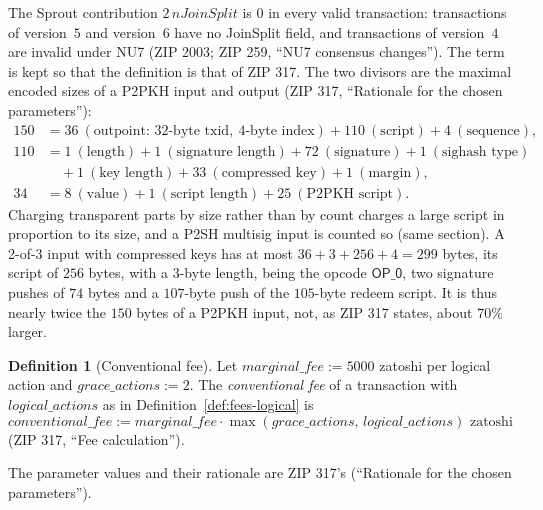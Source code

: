 \documentclass[11pt,a4paper]{article}
\theoremstyle{definition}
\newtheorem{definition}[theorem]{Definition}
\begin{document}
The Sprout contribution $2\,\mathit{nJoinSplit}$ is $0$ in every valid
transaction: transactions of version~$5$ and version~$6$ have no JoinSplit
field, and transactions of version~$4$ are invalid under NU7 (ZIP 2003; ZIP
259, ``NU7 consensus changes''). The term is kept so that the definition is
that of ZIP 317. The two divisors are the maximal encoded sizes of a P2PKH
input and output (ZIP 317, ``Rationale for the chosen parameters''):
\begin{align*}
  150 &= 36\ (\text{outpoint: } 32\text{-byte txid},\ 4\text{-byte index})
    + 110\ (\text{script}) + 4\ (\text{sequence}), \\
  110 &= 1\ (\text{length}) + 1\ (\text{signature length})
    + 72\ (\text{signature}) + 1\ (\text{sighash type}) \\
  &\quad + 1\ (\text{key length}) + 33\ (\text{compressed key})
    + 1\ (\text{margin}), \\
  34 &= 8\ (\text{value}) + 1\ (\text{script length})
    + 25\ (\text{P2PKH script}).
\end{align*}
Charging transparent parts by size rather than by count charges a large
script in proportion to its size, and a P2SH multisig input is counted so
(same section).
A 2-of-3 input with compressed keys has at most $36 + 3 + 256 + 4 = 299$
bytes, its script of $256$ bytes, with a $3$-byte length, being the opcode
$\mathsf{OP\_0}$, two signature pushes of $74$ bytes and a $107$-byte push
of the $105$-byte redeem script. It is thus nearly twice the $150$ bytes of
a P2PKH input, not, as ZIP 317 states, about $70\%$ larger.

\begin{definition}[Conventional fee]\label{def:fees-conventional}
Let $\mathit{marginal\_fee} := 5000$ zatoshi per logical action and
$\mathit{grace\_actions} := 2$. The \emph{conventional fee} of a transaction
with $\mathit{logical\_actions}$ as in Definition~\ref{def:fees-logical} is
\[
  \mathit{conventional\_fee} :=
  \mathit{marginal\_fee} \cdot
  \max(\mathit{grace\_actions},\, \mathit{logical\_actions})
  \text{ zatoshi}
\]
(ZIP 317, ``Fee calculation'').
\end{definition}

The parameter values and their rationale are ZIP 317's (``Rationale for the
chosen parameters'').
\end{document}
